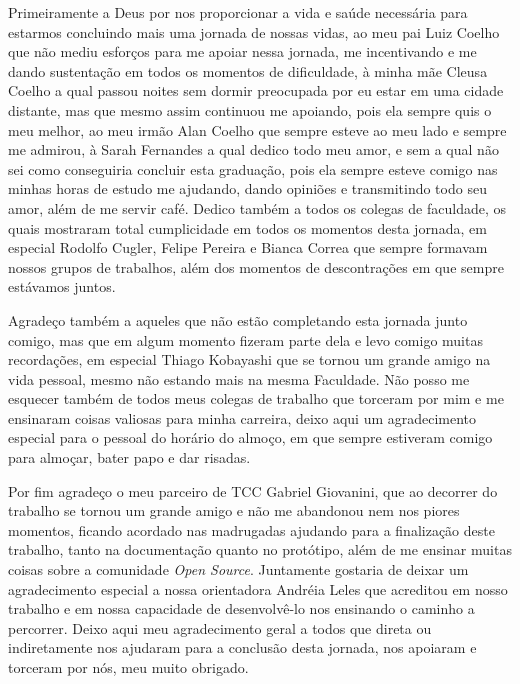 \begin{agradecimentos}
Primeiramente a Deus por nos proporcionar a vida e saúde necessária para estarmos concluindo mais uma jornada de nossas vidas, ao meu pai Luiz Coelho que não mediu esforços para me apoiar nessa jornada, me incentivando e me dando sustentação em todos os momentos de dificuldade, à minha mãe Cleusa Coelho a qual passou noites sem dormir preocupada por eu estar em uma cidade distante, mas que mesmo assim continuou me apoiando, pois ela sempre quis o meu melhor, ao meu irmão Alan Coelho que sempre esteve ao meu lado e sempre me admirou, à Sarah Fernandes a qual dedico todo meu amor, e sem a qual não sei como conseguiria concluir esta graduação, pois ela sempre esteve comigo nas minhas horas de estudo me ajudando, dando opiniões e transmitindo todo seu amor, além de me servir café. Dedico também a todos os colegas de faculdade, os quais mostraram total cumplicidade em todos os momentos desta jornada, em especial Rodolfo Cugler, Felipe Pereira e Bianca Correa que sempre formavam nossos grupos de trabalhos, além dos momentos de descontrações em que sempre estávamos juntos.

Agradeço também a aqueles que não estão completando esta jornada junto comigo, mas que em algum momento fizeram parte dela e levo comigo muitas recordações, em especial Thiago Kobayashi que se tornou um grande amigo na vida pessoal, mesmo não estando mais na mesma Faculdade. Não posso me esquecer também de todos meus colegas de trabalho que torceram por mim e me ensinaram coisas valiosas para minha carreira, deixo aqui um agradecimento especial para o pessoal do horário do almoço, em que sempre estiveram comigo para almoçar, bater papo e dar risadas.

Por fim agradeço o meu parceiro de TCC Gabriel Giovanini, que ao decorrer do trabalho se tornou um grande amigo e não me abandonou nem nos piores momentos, ficando acordado nas madrugadas ajudando para a finalização deste trabalho, tanto na documentação quanto no protótipo, além de me ensinar muitas coisas sobre a comunidade \textit{Open Source}. Juntamente gostaria de deixar um agradecimento especial a nossa orientadora Andréia Leles que acreditou em nosso trabalho e em nossa capacidade de desenvolvê-lo nos ensinando o caminho a percorrer. Deixo aqui meu agradecimento geral a todos que direta ou indiretamente nos ajudaram para a conclusão desta jornada, nos apoiaram e torceram por nós, meu muito obrigado.
\end{agradecimentos}